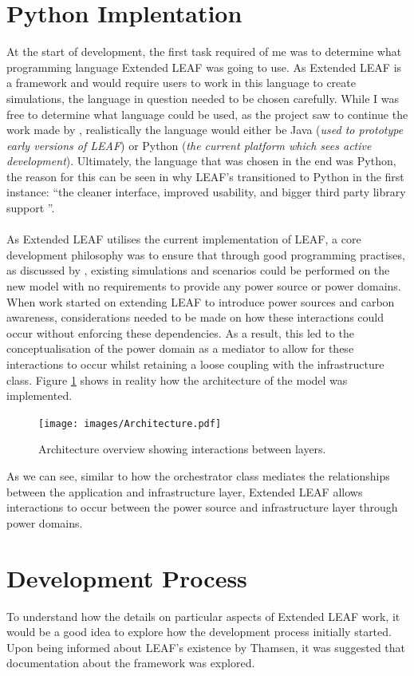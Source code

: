 \documentclass{l4proj}
\begin{document}
\section{Python Implentation}\label{sec:python}
At the start of development, the first task required of me was to determine what programming language Extended LEAF was going to use.
As Extended LEAF is a framework and would require users to work in this language to create simulations, the language in question needed to be chosen carefully.
While I was free to determine what language could be used, as the project saw to continue the work made by \cite{leaf2021}, realistically the language would either be Java (\textit{used to prototype early versions of LEAF}) or Python (\textit{the current platform which sees active development}).
Ultimately, the language that was chosen in the end was Python, the reason for this can be seen in why LEAF's transitioned to Python in the first instance: ``the cleaner interface, improved usability, and bigger third party library support \citep{leaf-java-git}''.\\ \\
As Extended LEAF utilises the current implementation of LEAF, a core development philosophy was to ensure that through good programming practises, as discussed by \citep{looseCoupling}, existing simulations and scenarios could be performed on the new model with no requirements to provide any power source or power domains.
When work started on extending LEAF to introduce power sources and carbon awareness, considerations needed to be made on how these interactions could occur without enforcing these dependencies.
As a result, this led to the conceptualisation of the power domain as a mediator to allow for these interactions to occur whilst retaining a loose coupling with the infrastructure class.
Figure \ref{fig:archtecture} shows in reality how the architecture of the model was implemented.

\begin{figure}[h]
    \centering
    \texttt{[image: images/Architecture.pdf]}
    ~
    \caption{Architecture overview showing interactions between layers.}
    \label{fig:archtecture}
\end{figure}

As we can see, similar to how the orchestrator class mediates the relationships between the application and infrastructure layer, Extended LEAF allows interactions to occur between the power source and infrastructure layer through power domains.

\section{Development Process}\label{sec:development}
To understand how the details on particular aspects of Extended LEAF work, it would be a good idea to explore how the development process initially started.
Upon being informed about LEAF's existence by Thamsen, it was suggested that documentation about the framework was explored.
\end{document}
